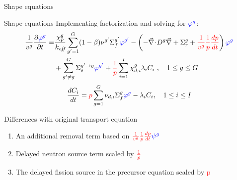\documentclass[8pt]{beamer}
\renewcommand{\div}{\vec{\nabla}\! \cdot \!}
\newcommand{\grad}{\vec{\nabla}}
\newcommand{\be}{\begin{equation*}}
\newcommand{\ee}{\end{equation*}}
\newcommand{\ben}{\begin{enumerate}}
\newcommand{\een}{\end{enumerate}}
\newcommand{\keff}{\ensuremath{k_{\textit{eff}}}}
\newcommand{\tcr}[1]{\textcolor{red}{#1}}
\newcommand{\tcb}[1]{\textcolor{blue}{#1}}
\begin{document}
\begin{frame}{Shape equations}

\begin{block}{Shape equations}
Implementing factorization and solving for $\tcb{\varphi^g}$:
\begin{align*}
\frac{1}{v^g} \frac{\partial \tcb{\varphi^g} }{\partial t} =& \frac{\chi_p^g}{\keff} \sum_{g'=1}^G (1-\beta) \nu^{g'} \Sigma_f^{g'} \tcb{\varphi^{g'}} -  \left( -\div D^g \grad  + \Sigma_r^g + \tcr{\frac{1}{v^g}}\tcr{\frac{1}{p}}\tcr{\frac{dp}{dt}}\right) \tcb{\varphi^g}  \nonumber \\
&  + \sum_{g'\neq g}^G\Sigma_s^{g'\to g} \tcb{\varphi^{g'}}  + \tcr{\frac{1}{p}}\sum_{i=1}^I\chi_{d,i}^g\lambda_i C_i \ , \quad 1 \le g \le G 
\end{align*}
\begin{equation*}
\frac{dC_i}{dt} = \tcr{p}\sum_{g=1}^G \nu_{d,i} \Sigma_f^g \tcb{\varphi^{g}} - \lambda_iC_i , \quad 1 \le i \le I
\end{equation*}
\end{block}

\begin{block}{Differences with original transport equation}
\ben
\item An additional removal term based on $\tcr{\frac{1}{v^g}\frac{1}{p}\frac{dp}{dt}} \tcb{\psi^g}$
\item Delayed neutron source term scaled by $\tcr{\frac{1}{p}}$
\item The delayed fission source in the precursor equation scaled by \tcr{p}
\een
\end{block}

\end{frame}

\end{document}
